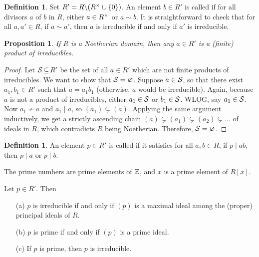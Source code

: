 \documentclass[11pt]{book}
\newcounter{counter}
\newtheorem{proposition}[counter]{Proposition}   \newtheorem{problem}[counter]{Problem}   \newtheorem*{proposition*}{Proposition}   \newtheorem*{lemma*}{Lemma}
\theoremstyle{definition}   \newtheorem{defn}[counter]{Definition} %
\newcommand{\bs}{\backslash}   \newcommand{\A}{\mathcal{A}}   \newcommand{\sy}{\textnormal{Syl}}   \newcommand{\size}[1]{\left| #1 \right|}
\newcommand{\vs}{\vspace{8pt}}
\numberwithin{counter}{chapter}
\begin{document}
\vs

\begin{defn}
Set $R' = R \bs(R\x \cup \{0\})$. An element $b \in R'$ is called  if for all divisors $a$ of $b$ in $R$, either $a \in R^{\times}$ or $a \sim b$. It is straightforward to check that for all $a,a' \in R$, if $a \sim a'$, then $a$ is irreducible if and only if $a'$ is irreducible.
\end{defn}

\vs

\begin{proposition}
If $R$ is a Noetherian domain, then any $a \in R'$ is a (finite) product of irreducibles.
\end{proposition}

\begin{proof}
Let $\mathcal{S} \operatorname{\subseteq} R'$ be the set of all $a \in R'$ which are not finite products of irreducibles. We want to show that $\mathcal{S} = \varnothing$. Suppose $a \in \mathcal{S}$, so that there exist $a_1,b_1 \in R'$ such that $a = a_1b_1$ (otherwise, $a$ would be irreducible). Again, because $a$ is not a product of irreducibles, either $a_1 \in \mathcal{S}$ or $b_1 \in \mathcal{S}$. WLOG, say $a_1 \in \mathcal{S}$. Now $a_1 \not\sim a$ and $a_1 \mid a$, so $(a_1) \subsetneq (a)$. Applying the same argument inductively, we get a strictly ascending chain $(a) \subsetneq (a_1) \subsetneq (a_2) \subsetneq \dots$ of ideals in $R$, which contradicts $R$ being Noetherian. Therefore, $\mathcal{S} = \varnothing$.
\end{proof}

\vs

\begin{defn}
An element $p \in R'$ is called  if it satisfies for all $a,b \in R$, if $p \mid ab$, then $p \mid a$ or $p \mid b$.
\end{defn}

\vs

\begin{example*}
The prime numbers are prime elements of $\operatorname{\mathbb{Z}}$, and $x$ is a prime element of $R[x]$.
\end{example*}

\vs

\begin{lemma}
Let $p \in R'$. Then
\begin{enumerate}
\item[(a)] $p$ is irreducible if and only if $(p)$ is a maximal ideal among the (proper) principal ideals of $R$.
\item[(b)] $p$ is prime if and only if $(p)$ is a prime ideal.
\item[(c)] If $p$ is prime, then $p$ is irreducible.
\end{enumerate}
\end{lemma}
\end{document}
